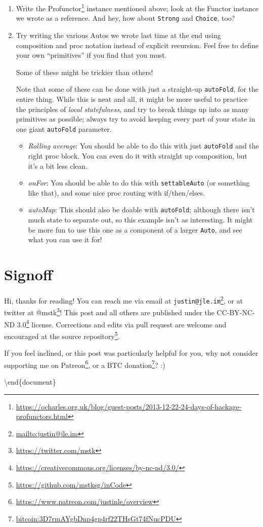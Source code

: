 \documentclass[]{article}
\renewcommand{\href}[2]{#2\footnote{\url{#1}}}
\begin{document}
\begin{enumerate}
\def\labelenumi{\arabic{enumi}.}
\item
  Write the
  \href{https://ocharles.org.uk/blog/guest-posts/2013-12-22-24-days-of-hackage-profunctors.html}{Profunctor}
  instance mentioned above; look at the Functor instance we wrote as a
  reference. And hey, how about \texttt{Strong} and \texttt{Choice}, too?
\item
  Try writing the various Autos we wrote last time at the end using composition
  and proc notation instead of explicit recursion. Feel free to define your own
  ``primitives'' if you find that you must.

  Some of these might be trickier than others!

  Note that some of these can be done with just a straight-up \texttt{autoFold},
  for the entire thing. While this is neat and all, it might be more useful to
  practice the principles of \emph{local statefulness}, and try to break things
  up into as many primitives as possible; always try to avoid keeping every part
  of your state in one giant \texttt{autoFold} parameter.

  \begin{itemize}
  \item
    \emph{Rolling average}: You should be able to do this with just
    \texttt{autoFold} and the right proc block. You can even do it with straight
    up composition, but it's a bit less clean.
  \item
    \emph{onFor}: You should be able to do this with \texttt{settableAuto} (or
    something like that), and some nice proc routing with if/then/elses.
  \item
    \emph{autoMap}: This should also be doable with \texttt{autoFold}; although
    there isn't much state to separate out, so this example isn't as
    interesting. It might be more fun to use this one as a component of a larger
    \texttt{Auto}, and see what you can use it for!
  \end{itemize}
\end{enumerate}

\section{Signoff}\label{signoff}

Hi, thanks for reading! You can reach me via email at
\href{mailto:justin@jle.im}{\nolinkurl{justin@jle.im}}, or at twitter at
\href{https://twitter.com/mstk}{@mstk}! This post and all others are published
under the \href{https://creativecommons.org/licenses/by-nc-nd/3.0/}{CC-BY-NC-ND
3.0} license. Corrections and edits via pull request are welcome and encouraged
at \href{https://github.com/mstksg/inCode}{the source repository}.

If you feel inclined, or this post was particularly helpful for you, why not
consider \href{https://www.patreon.com/justinle/overview}{supporting me on
Patreon}, or a \href{bitcoin:3D7rmAYgbDnp4gp4rf22THsGt74fNucPDU}{BTC donation}?
:)

\textbackslash end\{document\}
\end{document}
